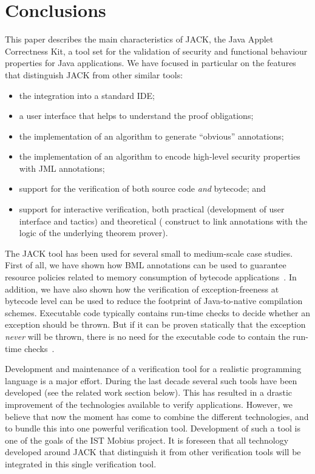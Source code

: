 
\section{Conclusions}\label{SecConcl}

This paper describes the main characteristics of JACK, the Java Applet
Correctness Kit, a tool set for the validation of security and
functional behaviour properties for Java applications. We have focused
in particular on the features that distinguish JACK from other similar
tools:
\begin{itemize}
\item the integration into a standard IDE;
\item a user interface that helps to understand the proof obligations;
\item the implementation of an algorithm to generate
``obvious'' annotations;
\item the implementation of an algorithm to encode high-level security
properties with JML annotations; 
\item support for the verification of both source code \emph{and}
bytecode; and
\item support for interactive verification, both practical
(development of user interface and tactics) and theoretical (\native
construct to link annotations with the logic of the
underlying theorem prover).
\end{itemize}

The JACK tool has been used for several small to medium-scale case
studies. First of all, we have shown how BML annotations can be used
to guarantee resource policies related to memory consumption of
bytecode applications~\cite{BarthePS05}. In addition, we have also
shown how the verification of exception-freeness at bytecode level can
be used to reduce the footprint of Java-to-native compilation
schemes. Executable code typically contains run-time checks to decide
whether an exception should be thrown. But if it can be proven
statically that the exception \emph{never} will be thrown, there is no
need for the executable code to contain the run-time
checks~\cite{DBLP:conf/cardis/CourbotPGV06}.


Development and maintenance of a verification tool for a realistic
programming language is a major effort. During the last decade several
such tools have been developed (see the related work section
below). This has resulted in a drastic improvement of the technologies
available to verify applications. However, we believe that now the
moment has come to combine the different technologies, and to bundle
this into one powerful verification tool. Development of such a tool
is one of the goals of the IST \textsf{Mobius} project. It is foreseen
that all technology developed around JACK that distinguish it from
other verification tools will be integrated in this single
verification tool.

